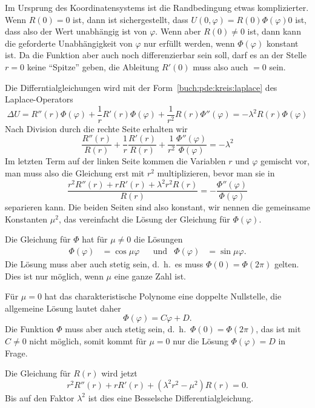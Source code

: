 Im Ursprung des Koordinatensystems ist die Randbedingung etwas
komplizierter.
Wenn $R(0)=0$ ist, dann ist sichergestellt, dass
$U(0,\varphi)=R(0)\Phi(\varphi)0$ ist, dass also der Wert unabhängig
ist von $\varphi$.
Wenn aber $R(0)\ne 0$ ist, dann kann die geforderte Unabhängigkeit
von $\varphi$ nur erfüllt werden, wenn $\Phi(\varphi)$ konstant ist.
Da die Funktion aber auch noch differenzierbar sein soll, darf es
an der Stelle $r=0$ keine ``Spitze'' geben, die Ableitung $R'(0)$
muss also auch $=0$ sein.

Die Differntialgleichungen wird mit der Form~\eqref{buch:pde:kreis:laplace}
des Laplace-Operators
\[
\Delta U
=
R''(r) \Phi(\varphi)
+
\frac1r R'(r)\Phi(\varphi)
+
\frac{1}{r^2} R(r)\Phi''(\varphi)
=
-\lambda^2
R(r)\Phi(\varphi)
\]
Nach Division durch die rechte Seite erhalten wir
\[
\frac{R''(r)}{R(r)}
+
\frac1r \frac{R'(r)}{R(r)}
+
\frac{1}{r^2} \frac{\Phi''(\varphi)}{\Phi(\varphi)}
=
-\lambda^2
\]
Im letzten Term auf der linken Seite kommen die Variablen $r$ und $\varphi$
gemischt vor, man muss also die Gleichung erst mit $r^2$ multiplizieren,
bevor man sie in 
\[
\frac{r^2R''(r)+rR'(r)+\lambda^2 r^2R(r)}{R(r)}
=
-\frac{\Phi''(\varphi)}{\Phi(\varphi)}
\]
separieren kann.
Die beiden Seiten sind also konstant, wir nennen die gemeinsame
Konstanten $\mu^2$, das vereinfacht die Lösung der Gleichung
für $\Phi(\varphi)$.

Die Gleichung für $\Phi$ hat für $\mu\ne 0$ die Lösungen
\begin{align*}
\Phi(\varphi) &= \cos\mu\varphi
&&\text{und}&
\Phi(\varphi) &= \sin\mu\varphi.
\end{align*}
Die Lösung muss aber auch stetig sein, d.~h.~es muss $\Phi(0)=\Phi(2\pi)$
gelten.
Dies ist nur möglich, wenn $\mu$ eine ganze Zahl ist.

Für $\mu=0$ hat das charakteristische Polynome eine doppelte Nullstelle,
die allgemeine Lösung lautet daher
\[
\Phi(\varphi)= C \varphi + D.
\]
Die Funktion $\Phi$ muss aber auch stetig sein, d.~h.~$\Phi(0)=\Phi(2\pi)$,
das ist mit $C\ne 0$ nicht möglich, somit kommt für $\mu=0$ nur die
Lösung $\Phi(\varphi)=D$ in Frage.

Die Gleichung für $R(r)$ wird jetzt
\begin{equation}
r^2R''(r) + rR'(r)+(\lambda^2 r^2-\mu^2)R(r)
=
0.
\label{buch:pde:kreis:Rdgl}
\end{equation}
Bis auf den Faktor $\lambda^2$ ist dies eine Besselsche Differentialgleichung.

